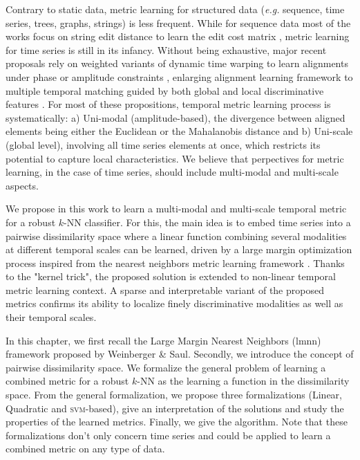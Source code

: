 Contrary to static data, metric learning for structured data (\textit{e.g.} sequence, time series, trees, graphs, strings) is less frequent. While for sequence data most of the works focus on string edit distance to learn the edit cost matrix \cite{Oncina2006,Bellet2012}, metric learning for time series is still in its infancy. Without being exhaustive, major recent proposals rely on weighted variants of dynamic time warping to learn alignments under phase or amplitude constraints \cite{Reyes2011,Jeong2011,ZhangX.-L.Z.-G.Luo2014,Mei2015}, enlarging alignment learning framework to multiple temporal matching guided by both global and local discriminative features \cite{Frambourg2013a}. For most of these propositions, temporal metric learning process is systematically: a) Uni-modal (amplitude-based), the divergence between aligned elements being either the Euclidean or the Mahalanobis distance and b) Uni-scale (global level), involving all time series elements at once, which restricts its potential to capture local characteristics. We believe that perpectives for metric learning, in the case of time series, should include multi-modal and multi-scale aspects.

We propose in this work to learn a multi-modal and multi-scale temporal metric for a robust $k$-NN classifier. For this, the main idea is to embed time series into a pairwise dissimilarity space where a linear function combining several modalities at different temporal scales can be learned, driven by a large margin optimization process inspired from the nearest neighbors metric learning framework \cite{Weinberger2009}. Thanks to the "kernel trick", the proposed solution is extended to non-linear temporal metric learning context. A sparse and interpretable variant of the proposed metrics confirms its ability to localize finely discriminative modalities as well as their temporal scales. 

In this chapter, we first recall the Large Margin Nearest Neighbors ({\sc lmnn}) framework proposed by Weinberger \& Saul. Secondly, we introduce the concept of pairwise dissimilarity space. We formalize the general problem of learning a combined metric for a robust $k$-NN as the learning a function in the dissimilarity space. From the general formalization, we propose three formalizations (Linear, Quadratic and \textsc{svm}-based), give an interpretation of the solutions and study the properties of the learned metrics. Finally, we give the algorithm. Note that these formalizations don't only concern time series and could be applied to learn a combined metric on any type of data. 


